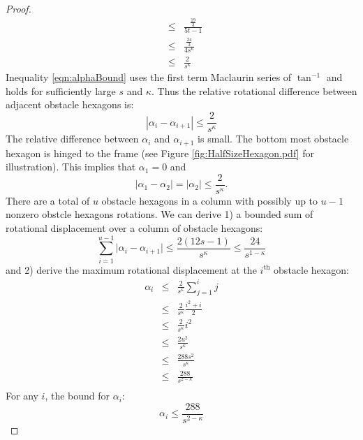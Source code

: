 \documentclass[10pt]{CSUNthesis}
\theoremstyle{plain}%
\theoremstyle{definition}
\theoremstyle{remark}
\newcommand{\ith}{i^\text{th}}
\newcommand{\lr}[1]{\left( #1 \right)}
\newcommand{\vlr}[1]{\left\vert #1 \right\vert}
\begin{document}
\begin{proof}
\begin{equation}
\begin{array}{rcl}
& \leq & \frac{\frac{19}{3}}{5t -1} \\
& \leq & \frac{\frac{24}{3}}{4s^\kappa} \\
&\leq& \frac{2}{s^\kappa}
\end{array} 
\end{equation}
Inequality \ref{eqn:alphaBound} uses the first term Maclaurin series of $\tan^{-1}$ and holds for sufficiently large $s$ and $\kappa$.  
Thus the relative rotational difference between adjacent obstacle hexagons is:
\begin{equation}\label{eqn:angularBound}
\left\vert \alpha_i - \alpha_{i+1} \right\vert \leq\frac{2}{s^\kappa}
\end{equation}
The relative difference between $\alpha_i$ and $\alpha_{i+1}$ is small.
The bottom most obstacle hexagon is hinged to the frame (see Figure \ref{fig:HalfSizeHexagon.pdf} for illustration). 
This implies that $\alpha_1 = 0$ and
$$\vlr{\alpha_1 - \alpha_2}=\vlr{\alpha_2}\leq \frac{2}{s^\kappa}.$$
There are a total of $u$ obstacle hexagons in a column with possibly up to $u-1$ nonzero obstcle hexagons rotations.
We can derive 1) a bounded sum of rotational displacement over a column of obstacle hexagons:
\begin{equation}\label{eqn:angularSumBound}
\sum_{i=1}^{u-1} \vert \alpha_i - \alpha_{i+1} \vert \leq \frac{2(12s-1)}{s^\kappa} \leq \frac{24}{s^{1-\kappa}}
\end{equation}
and 2) derive the maximum rotational displacement at the $\ith$ obstacle hexagon:
\begin{eqnarray*}
\alpha_i &\leq& \frac{2}{s^\kappa} \sum_{j=1}^i j\\
		 &\leq& \frac{2}{s^\kappa}  \frac{i^2+i}{2}\\
		 &\leq& \frac{2}{s^\kappa}  i^2\\
		 &\leq& \frac{2u^2}{s^\kappa}\\
		 &\leq& \frac{288s^2}{s^{\kappa}}\\
		 &\leq& \frac{288}{s^{2-\kappa}} \\
\end{eqnarray*}
For any $i$, the bound for $\alpha_i$:
\begin{equation}\label{eqn:angularMaxBound}
\alpha_i \leq \frac{288}{s^{2-\kappa}}
\end{equation}


\end{proof}
\end{document}
